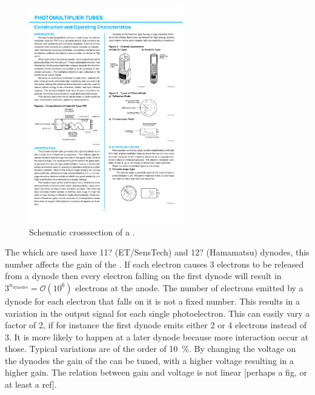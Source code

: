 \begin{figure}
    \centering
    \includegraphics[width=0.6\textwidth]
                    {plots/station/pmt_schematic}
    \caption{Schematic crosssection of a \pmt.}
    \label{fig:pmt_schematic}
\end{figure}

The \pmts which are used have 11? (ET/SensTech) and 12? (Hamamatsu) dynodes, this number affects the gain of the \pmt. If each electron causes \num{3} electrons to be released from a dynode then every electron falling on the first dynode will result in $3^{n_{\mathrm{dynodes}}} = \mathcal{O}(10^6)$ electrons at the anode. The number of electrons emitted by a dynode for each electron that falls on it is not a fixed number. This results in a variation in the output signal for each single photoelectron. This can easily vary a factor of 2, if for instance the first dynode emits either 2 or 4 electrons instead of 3. It is more likely to happen at a later dynode because more interaction occur at those. Typical variations are of the order of \SI{10}{\percent}. By changing the voltage on the dynodes the gain of the \pmt can be tuned, with a higher voltage resulting in a higher gain. The relation between gain and voltage is not linear [perhaps a fig, or at least a ref].

